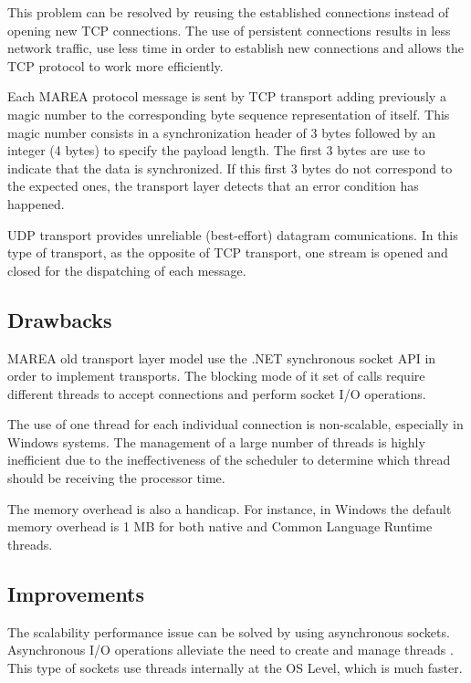 This problem can be resolved by reusing the established connections instead of opening new TCP connections. The use of persistent connections results in less network traffic, use less time in order to establish new connections and allows the TCP protocol to work more efficiently.

Each MAREA protocol message is sent by TCP transport adding previously a magic number to the corresponding byte sequence representation of itself. This magic number consists in a  synchronization header of 3 bytes followed by an integer (4 bytes) to specify the payload length. The first 3 bytes are use to indicate that the data is synchronized. If this first 3 bytes do not correspond to the expected ones, the transport layer detects that an error condition has happened.

UDP transport provides unreliable (best-effort) datagram comunications. In this type of transport, as the opposite of TCP transport, one stream is opened and closed for the dispatching of each message.

\subsection{Drawbacks}\label{SS:Transports-Drawbacks}

MAREA old transport layer model use the .NET synchronous socket API in order to implement transports. The blocking mode of it set of calls require different threads to accept connections and perform socket I/O operations. 

The use of one thread for each individual connection is non-scalable, especially in Windows systems. The management of a large number of threads is highly inefficient due to the  ineffectiveness of the scheduler to determine which thread should be receiving the processor time. 

The memory overhead is also a handicap. For instance, in Windows the default memory overhead is 1 MB for both native and Common Language Runtime threads.

\subsection{Improvements}\label{SS:Transports-Improvements}

The scalability performance issue can be solved by using asynchronous sockets. Asynchronous I/O operations alleviate the need to create and manage threads \cite{cite:performance-sockets}. This type of sockets use threads internally at the OS Level, which is much faster.

